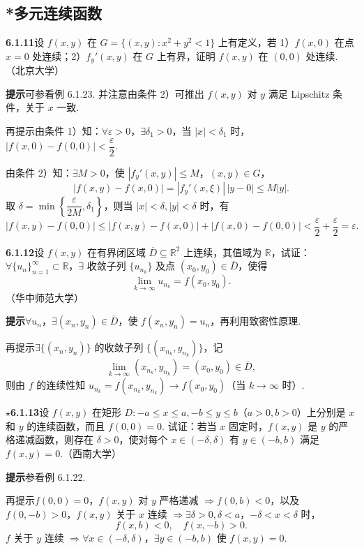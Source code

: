\documentclass[UTF8, 12pt, fontset=fandol, oneside]{ctexart}
\begin{document}
\subsection*{*多元连续函数}

\noindent\textbf{6.1.11}\quad 设 $f(x,y)$ 在 $G=\{(x,y):x^2+y^2<1\}$ 上有定义，若 1）$f(x,0)$ 在点 $x=0$ 处连续；2）$f_y'(x,y)$ 在 $G$ 上有界，证明 $f(x,y)$ 在 $(0,0)$ 处连续.（北京大学）

\noindent\textbf{提示}\quad 可参看例 6.1.23. 并注意由条件 2）可推出 $f(x,y)$ 对 $y$ 满足 Lipschitz 条件，关于 $x$ 一致.

再提示\quad 由条件 1）知：$\forall\varepsilon>0$，$\exists\delta_1>0$，当 $|x|<\delta_1$ 时，$|f(x,0)-f(0,0)|<\dfrac{\varepsilon}{2}$.

由条件 2）知：$\exists M>0$，使 $|f_y'(x,y)|\le M$，$(x,y)\in G$，
\[
  |f(x,y)-f(x,0)|=|f_y'(x,\xi)|\,|y-0|\le M|y|.
\]
取 $\delta=\min\left\{\dfrac{\varepsilon}{2M},\delta_1\right\}$，则当 $|x|<\delta,|y|<\delta$ 时，有
\[
  |f(x,y)-f(0,0)|\le |f(x,y)-f(x,0)|+|f(x,0)-f(0,0)|
  <\frac{\varepsilon}{2}+\frac{\varepsilon}{2}=\varepsilon.
\]

\noindent\textbf{6.1.12}\quad 设 $f(x,y)$ 在有界闭区域 $\overline D\subseteq\mathbb{R}^2$ 上连续，其值域为 $\mathbb{R}$，试证：$\forall\{u_n\}_{n=1}^\infty\subset\mathbb{R}$，$\exists$ 收敛子列 $\{u_{n_k}\}$ 及点 $(x_0,y_0)\in\overline D$，使得
\[
  \lim_{k\to\infty}u_{n_k}=f(x_0,y_0).
\]
（华中师范大学）

\noindent\textbf{提示}\quad $\forall u_n$，$\exists(x_n,y_n)\in\overline D$，使 $f(x_n,y_n)=u_n$，再利用致密性原理.

再提示\quad $\exists\{(x_n,y_n)\}$ 的收敛子列 $\{(x_{n_k},y_{n_k})\}$，记
\[
  \lim_{k\to\infty}(x_{n_k},y_{n_k})=(x_0,y_0)\in\overline D,
\]
则由 $f$ 的连续性知 $u_{n_k}=f(x_{n_k},y_{n_k})\to f(x_0,y_0)$（当 $k\to\infty$ 时）.

\noindent\textbf{$\star$6.1.13}\quad 设 $f(x,y)$ 在矩形 $D:-a\le x\le a,-b\le y\le b$（$a>0,b>0$）上分别是 $x$ 和 $y$ 的连续函数，而且 $f(0,0)=0$. 试证：若当 $x$ 固定时，$f(x,y)$ 是 $y$ 的严格递减函数，则存在 $\delta>0$，使对每个 $x\in(-\delta,\delta)$ 有 $y\in(-b,b)$ 满足 $f(x,y)=0$.（西南大学）

\noindent\textbf{提示}\quad 参看例 6.1.22.

再提示\quad $f(0,0)=0$，$f(x,y)$ 对 $y$ 严格递减 $\Rightarrow f(0,b)<0$，以及 $f(0,-b)>0$，$f(x,y)$ 关于 $x$ 连续 $\Rightarrow\exists\delta>0,\delta<a$，$-\delta<x<\delta$ 时，
\[
  f(x,b)<0,\quad f(x,-b)>0.
\]
$f$ 关于 $y$ 连续 $\Rightarrow \forall x\in(-\delta,\delta)$，$\exists y\in(-b,b)$ 使 $f(x,y)=0$.
\end{document}
